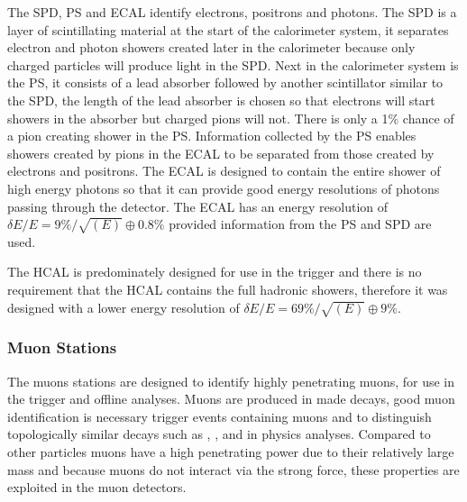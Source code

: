 The SPD, PS and ECAL identify electrons, positrons and photons. The SPD is a layer of scintillating material at the start of the calorimeter system, it separates electron and photon showers created later in the calorimeter because only charged particles will produce light in the SPD. Next in the calorimeter system is the PS, it consists of a lead absorber followed by another scintillator similar to the SPD, the length of the lead absorber is chosen so that electrons will start showers in the absorber but charged pions will not. There is only a 1$\%$ chance of a pion creating shower in the PS. Information collected by the PS enables showers created by pions in the ECAL to be separated from those created by electrons and positrons. The ECAL is designed to contain the entire shower of high energy photons so that it can provide good energy resolutions of photons passing through the detector. The ECAL has an energy resolution of $\delta E / E = 9\%/\sqrt{(E)} \oplus 0.8\%$  provided information from the PS and SPD are used. 

The HCAL is predominately designed for use in the trigger and there is no requirement that the HCAL contains the full hadronic showers, therefore it was designed with a lower energy resolution of $\delta E / E = 69\% / \sqrt{(E)} \oplus 9\%$. 


\subsubsection{Muon Stations}
\label{Muon_stations}

The muons stations are designed to identify highly penetrating muons, for use in the trigger and offline analyses. Muons are produced in made \bhadron decays, good muon identification is necessary trigger events containing muons and to distinguish topologically similar decays such as \bmumu, \bdkpi, \bskk and \bskpi in physics analyses. 
Compared to other particles muons have a high penetrating power due to their relatively large mass and because muons do not interact via the strong force, these properties are exploited in the muon detectors. 


